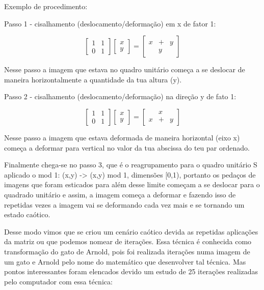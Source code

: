 \documentclass[a4paper, 12pt]{article}
\begin{document}
Exemplo de procedimento:

Passo 1 - cisalhamento (deslocamento/deformação) em x de fator 1:

$$\begin{bmatrix}
1&1\\
0&1
\end{bmatrix}\begin{bmatrix}
x\\
y
\end{bmatrix} =\begin{bmatrix}
x&+&y\\
&y&
\end{bmatrix}$$

Nesse passo a imagem que estava no quadro unitário começa a se deslocar de maneira horizontalmente a quantidade da tua altura (y).

Passo 2 - cisalhamento (deslocamento/deformação) na direção y de fato 1:

$$\begin{bmatrix}
1&1\\
0&1
\end{bmatrix}\begin{bmatrix}
x\\
y
\end{bmatrix} =\begin{bmatrix}
&x&\\
x&+&y
\end{bmatrix}$$

Nesse passo a imagem que estava deformada de maneira horizontal (eixo x) começa a deformar para vertical no valor da tua abscissa do teu par ordenado.

Finalmente chega-se no passo 3, que é o reagrupamento para o quadro unitário S aplicado o mod 1: (x,y) -> (x,y) mod 1, dimensões [0,1), portanto os pedaços de imagens que foram esticados para além desse limite começam a se deslocar para o quadrado unitário e assim, a imagem começa a deformar e fazendo isso de repetidas vezes a imagem vai se deformando cada vez mais e se tornando um estado caótico.

Desse modo vimos que se criou um cenário caótico devida as repetidas aplicações da matriz ou que podemos nomear de iterações. Essa técnica é conhecida como transformação do gato de Arnold, pois foi realizada iterações numa imagem de um gato e Arnold pelo nome do matemático que desenvolver tal técnica. Mas pontos interessantes foram elencados devido um estudo de 25 iterações realizadas pelo computador com essa técnica:
\end{document}
